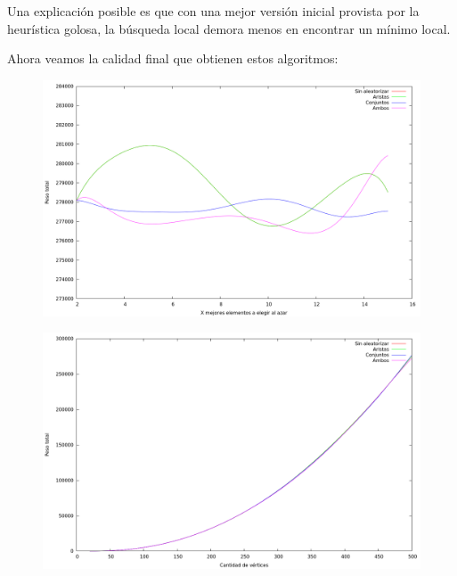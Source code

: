 Una explicación posible es que con una mejor versión inicial provista por
la heurística golosa, la búsqueda local demora menos en encontrar un mínimo
local.

Ahora veamos la calidad final que obtienen estos algoritmos:


\begin{figure}[H]
  \begin{center}
    \includegraphics[scale=0.35]{imagenes/grasp-local-x-peso.png}
  \end{center}
\end{figure}

\begin{figure}[H]
  \begin{center}
    \includegraphics[scale=0.35]{imagenes/grasp-local-n-peso.png}
  \end{center}
\end{figure}

